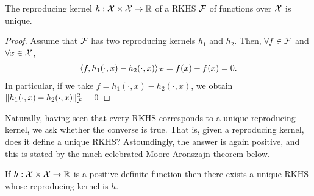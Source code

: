 \begin{lemma}\label{eq:rkhsunique}
  The reproducing kernel $h:{\mathcal X}\times{\mathcal X}\to\mathbb{R}$ of a RKHS ${\mathcal F}$ of functions over ${\mathcal X}$ is unique.
\end{lemma}

\begin{proof}
  Assume that ${\mathcal F}$ has two reproducing kernels $h_1$ and $h_2$. 
  Then, $\forall f\in{\mathcal F}$ and $\forall x\in{\mathcal X}$,
  \begin{align*}
    \langle f,h_1(\cdot,x) - h_2(\cdot,x)\rangle_{\mathcal F} = f(x) - f(x) = 0.
  \end{align*}
  In particular, if we take $f = h_1(\cdot,x) - h_2(\cdot,x)$, we obtain $\lVert h_1(\cdot,x) - h_2(\cdot,x)\rVert^2_{\mathcal F} = 0$
\end{proof}

Naturally, having seen that every RKHS corresponds to a unique reproducing kernel, we ask whether the converse is true.
That is, given a reproducing kernel, does it define a unique RKHS?
Astoundingly, the answer is again positive, and this is stated by the much celebrated Moore-Aronszajn theorem below.

\begin{theorem}
  If $h:{\mathcal X}\times{\mathcal X}\to\mathbb{R}$ is a positive-definite function then there exists a unique RKHS whose reproducing kernel is $h$.
\end{theorem}

